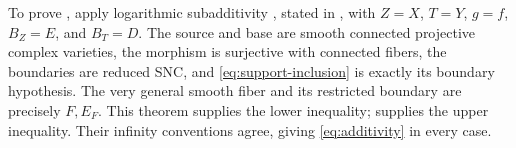 To prove , apply logarithmic subadditivity
\cite[Corollary~\FoundationLogNumber]{Foundation}, stated in , with
$Z=X$, $T=Y$, $g=f$, $B_Z=E$, and $B_T=D$. The source and base are smooth
connected projective complex varieties, the morphism is surjective with
connected fibers, the boundaries are reduced SNC, and
\eqref{eq:support-inclusion} is exactly its boundary hypothesis.
The very general smooth fiber and its restricted boundary are precisely
$F,E_F$. This theorem supplies the lower inequality; 
supplies the upper inequality. Their infinity conventions agree, giving
\eqref{eq:additivity} in every case.

